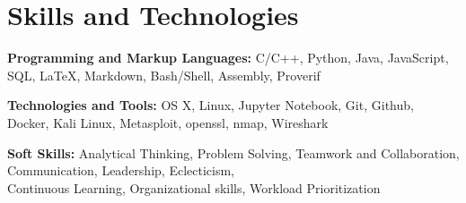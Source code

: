 
\section{Skills and Technologies}

\begin{onecolentry}
    \textbf{Programming and Markup Languages:} C/C++, Python, Java, JavaScript, SQL, LaTeX, Markdown, Bash/Shell, Assembly, Proverif
\end{onecolentry}

\vspace{0.2 cm} %

\begin{onecolentry}
    \textbf{Technologies and Tools:} OS X, Linux, Jupyter Notebook, Git, Github, Docker, Kali Linux, Metasploit, openssl, nmap, Wireshark
\end{onecolentry}

\vspace{0.2 cm} %

\begin{onecolentry}
    \textbf{Soft Skills:}  Analytical Thinking, Problem Solving, Teamwork and Collaboration, Communication, Leadership, Eclecticism,\\ 
    \text{\hspace{1.68cm}} Continuous Learning, Organizational skills, Workload Prioritization
\end{onecolentry}
